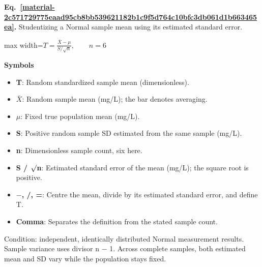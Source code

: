 \documentclass[11pt,a4paper]{article}
\begin{document}
\par\medskip
\noindent\begin{minipage}{\linewidth}
\label{material-2c571729775eaad95cb8bb539621182b1c9f5d764c10bfc3db061d1b663465ea}
\noindent\textbf{Eq.~\ref*{material-2c571729775eaad95cb8bb539621182b1c9f5d764c10bfc3db061d1b663465ea}.} Studentizing a Normal sample mean using its estimated standard error.\par\nopagebreak
\begin{center}\begin{adjustbox}{max width=\linewidth}$\displaystyle T=\frac{\bar X-\mu}{S/\sqrt n},\qquad n=6$\end{adjustbox}\end{center}

\par\noindent\textbf{Symbols}

\begin{itemize}\setlength{\itemsep}{1pt}\setlength{\parsep}{0pt}
\item \textbf{T}: Random standardized sample mean (dimensionless).
\item \textbf{\ensuremath{\bar{X}}}: Random sample mean (mg/L); the bar denotes averaging.
\item \textbf{\ensuremath{\mu}}: Fixed true population mean (mg/L).
\item \textbf{S}: Positive random sample SD estimated from the same sample (mg/L).
\item \textbf{n}: Dimensionless sample count, six here.
\item \textbf{S / \ensuremath{\sqrt{\vphantom{x}}}n}: Estimated standard error of the mean (mg/L); the square root is positive.
\item \textbf{\ensuremath{-}, /, =}: Centre the mean, divide by its estimated standard error, and define T.
\item \textbf{Comma}: Separates the definition from the stated sample count.
\end{itemize}

Condition: independent, identically distributed Normal measurement results. Sample variance uses divisor n \ensuremath{-} 1. Across complete samples, both estimated mean and SD vary while the population stays fixed.

\end{minipage}\par
\medskip
\end{document}
